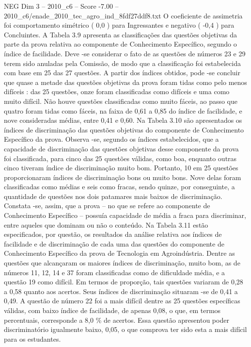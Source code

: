 \begin{textsample}{NEG Dim 3 – 2010\_c6 – Score -7.00 – 2010\_c6/enade\_2010\_tec\_agro\_ind\_8fdf27ddf8.txt}
O coeficiente de assimetria foi comportamento simétrico ( 0,0 ) para Ingressantes e negativo ( -0,4 ) para Concluintes.
A Tabela 3.9 apresenta as classificações das questões objetivas da parte da prova relativa ao componente de Conhecimento Específico, segundo o índice de facilidade.
Deve -se considerar o fato de as questões de números 23 e 29 terem sido anuladas pela Comissão, de modo que a classificação foi estabelecida com base em 25 das 27 questões.
A partir dos índices obtidos, pode -se concluir que quase a metade das questões objetivas da prova foram tidas como pelo menos difíceis : das 25 questões, onze foram classificadas como difíceis e uma como muito difícil.
Não houve questões classificadas como muito fáceis, ao passo que quatro foram tidas como fáceis, na faixa de 0,61 a 0,85 do índice de facilidade, e nove consideradas médias, entre 0,41 e 0,60.
Na Tabela 3.10 são apresentados os índices de discriminação das questões objetivas do componente de Conhecimento Específico da prova.
Observa -se, segundo os índices estabelecidos, que a capacidade de discriminação das questões objetivas desse componente da prova foi classificada, para cinco das 25 questões válidas, como boa, enquanto outras cinco tiveram índice de discriminação muito bom.
Portanto, 10 em 25 questões proporcionaram índices de discriminação bons ou muito bons.
Nove delas foram classificadas como médias e seis como fracas, sendo quinze, por conseguinte, a quantidade de questões nos dois patamares mais baixos de discriminação.
Constata -se, assim, que a prova – no que se refere ao componente de Conhecimento Específico – possuía capacidade de média a fraca para discriminar, entre aqueles que dominam ou não o conteúdo.
Na Tabela 3.11 estão especificados, por questão, os resultados da análise relativa aos índices de facilidade e de discriminação de cada uma das questões do componente de Conhecimento Específico da prova de Tecnologia em Agroindústria.
Dentre as questões que alcançaram os maiores índices de discriminação, muito bom, as de números 11, 12, 14 e 37 foram classificadas como de dificuldade média, e a questão 19 como difícil.
Em termos de proporção, tais questões variaram de 0,28 a 0,58 quanto aos acertos.
Seus índices de discriminação situaram -se de 0,41 a 0,49.
A questão de número 22 foi a mais difícil dentre as 25 questões específicas válidas, com baixo índice de facilidade, de apenas 0,08, o que, em termos percentuais, corresponde a 8,0 \% de acertos.
Essa questão apresentou poder discriminatório igualmente baixo, 0,05, o que comprova ter sido esta a mais difícil para os estudantes.

\end{textsample}
